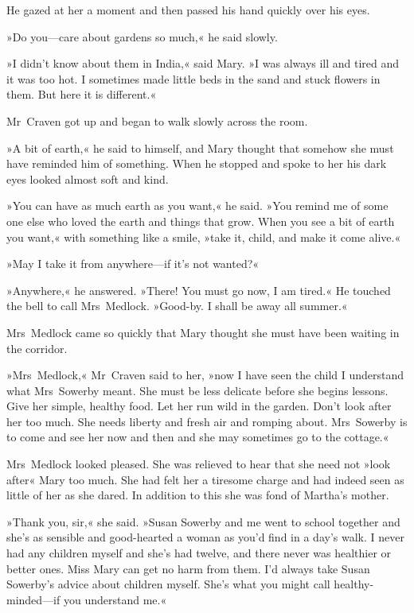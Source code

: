 He gazed at her a moment and then passed his hand quickly over his eyes.

»Do you—care about gardens so much,« he said slowly.

»I didn't know about them in India,« said Mary. »I was always ill and tired and it was too hot. I sometimes made little beds in the sand and stuck flowers in them. But here it is different.«

Mr~Craven got up and began to walk slowly across the room.

»A bit of earth,« he said to himself, and Mary thought that somehow she must have reminded him of something. When he stopped and spoke to her his dark eyes looked almost soft and kind.

»You can have as much earth as you want,« he said. »You remind me of some one else who loved the earth and things that grow. When you see a bit of earth you want,« with something like a smile, »take it, child, and make it come alive.«

»May I take it from anywhere—if it's not wanted?«

»Anywhere,« he answered. »There! You must go now, I am tired.« He touched the bell to call Mrs~Medlock. »Good-by. I shall be away all summer.«

Mrs~Medlock came so quickly that Mary thought she must have been waiting in the corridor.

»Mrs~Medlock,« Mr~Craven said to her, »now I have seen the child I understand what Mrs~Sowerby meant. She must be less delicate before she begins lessons. Give her simple, healthy food. Let her run wild in the garden. Don't look after her too much. She needs liberty and fresh air and romping about. Mrs~Sowerby is to come and see her now and then and she may sometimes go to the cottage.«

Mrs~Medlock looked pleased. She was relieved to hear that she need not »look after« Mary too much. She had felt her a tiresome charge and had indeed seen as little of her as she dared. In addition to this she was fond of Martha's mother.

»Thank you, sir,« she said. »Susan Sowerby and me went to school together and she's as sensible and good-hearted a woman as you'd find in a day's walk. I never had any children myself and she's had twelve, and there never was healthier or better ones. Miss Mary can get no harm from them. I'd always take Susan Sowerby's advice about children myself. She's what you might call healthy-minded—if you understand me.«

